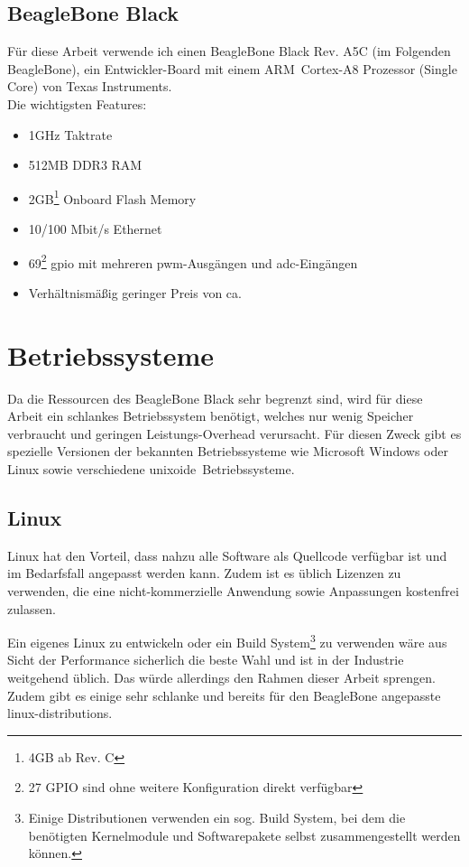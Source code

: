 \subsection{BeagleBone Black}
Für diese Arbeit verwende ich einen BeagleBone Black Rev. A5C (im Folgenden BeagleBone), ein Entwickler-Board mit einem ARM\textregistered ~Cortex\texttrademark -A8 Prozessor (Single Core) von Texas Instruments.\\

\noindent Die wichtigsten Features:
\begin{itemize}
\item 1GHz Taktrate
\item 512MB DDR3 RAM
\item 2GB\footnote{4GB ab Rev. C} Onboard Flash Memory
\item 10/100 Mbit/s Ethernet
\item 69\footnote{27 GPIO sind ohne weitere Konfiguration direkt verfügbar} \gls{gpio} mit mehreren \gls{pwm}-Ausgängen und \gls{adc}-Eingängen
\item Verhältnismäßig geringer Preis von ca. 
\end{itemize}


\section{Betriebssysteme}
Da die Ressourcen des BeagleBone Black sehr begrenzt sind, wird für diese Arbeit ein schlankes Betriebssystem benötigt, welches nur wenig Speicher verbraucht und geringen Leistungs-Overhead verursacht. Für diesen Zweck gibt es spezielle Versionen der bekannten Betriebssysteme wie Microsoft Windows oder Linux sowie verschiedene \glqq unixoide\grqq ~Betriebssysteme.


\subsection{Linux}
Linux hat den Vorteil, dass nahzu alle Software als Quellcode verfügbar ist und im Bedarfsfall angepasst werden kann. Zudem ist es üblich Lizenzen zu verwenden, die eine nicht-kommerzielle Anwendung sowie Anpassungen kostenfrei zulassen.

Ein eigenes Linux zu entwickeln oder ein Build System\footnote{Einige Distributionen verwenden ein sog. Build System, bei dem die benötigten Kernelmodule und Softwarepakete selbst zusammengestellt werden können.} zu verwenden wäre aus Sicht der Performance sicherlich die beste Wahl und ist in der Industrie weitgehend üblich. Das würde allerdings den Rahmen dieser Arbeit sprengen. Zudem gibt es einige sehr schlanke und bereits für den BeagleBone angepasste \glspl{linux-distribution}.


